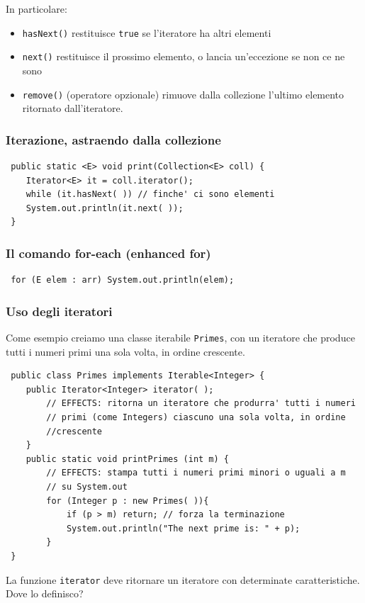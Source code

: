 \documentclass[a4paper,10pt]{article}
\begin{document}
In particolare:
\begin{itemize}
 \item \texttt{hasNext()} restituisce \texttt{true} se l'iteratore ha altri elementi
 \item \texttt{next()} restituisce il prossimo elemento, o lancia un'eccezione se non ce ne sono
 \item \texttt{remove()} (operatore opzionale) rimuove dalla collezione l'ultimo elemento ritornato dall'iteratore.
\end{itemize}

\subsubsection{Iterazione, astraendo dalla collezione}

\begin{lstlisting}
 public static <E> void print(Collection<E> coll) {
    Iterator<E> it = coll.iterator();
    while (it.hasNext( )) // finche' ci sono elementi
    System.out.println(it.next( ));
 } 
\end{lstlisting}

\subsubsection{Il comando for-each (enhanced for)}
\begin{lstlisting}
 for (E elem : arr) System.out.println(elem);
\end{lstlisting}

\subsubsection{Uso degli iteratori}
Come esempio creiamo una classe iterabile \texttt{Primes}, con un iteratore che produce tutti i numeri primi una sola volta, in ordine crescente.

\begin{lstlisting}
 public class Primes implements Iterable<Integer> {
    public Iterator<Integer> iterator( );
        // EFFECTS: ritorna un iteratore che produrra' tutti i numeri
        // primi (come Integers) ciascuno una sola volta, in ordine
        //crescente
    }
    public static void printPrimes (int m) {
        // EFFECTS: stampa tutti i numeri primi minori o uguali a m
        // su System.out
        for (Integer p : new Primes( )){
            if (p > m) return; // forza la terminazione
            System.out.println("The next prime is: " + p);
        }
 }
\end{lstlisting}
La funzione \texttt{iterator} deve ritornare un iteratore con determinate caratteristiche. Dove lo definisco?
\newpage
\end{document}
